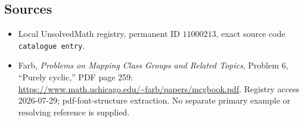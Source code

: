 \documentclass[11pt]{article}
\begin{document}
\subsection{Sources}
\begin{itemize}
\item Local UnsolvedMath registry, permanent ID \(11000213\), exact source code \texttt{catalogue entry}.
\item Farb, \emph{Problems on Mapping Class Groups and Related Topics}, Problem 6, ``Purely cyclic,'' PDF page 259: \url{https://www.math.uchicago.edu/~farb/papers/mcgbook.pdf}. Registry access 2026-07-29; pdf-font-structure extraction. No separate primary example or resolving reference is supplied.
\end{itemize}
\end{document}
